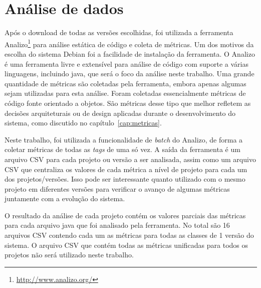 \section{Análise de dados}

Após o download de todas as versões escolhidas, foi utilizada a ferramenta Analizo\footnote{\url{http://www.analizo.org/}}  para análise estática de código e coleta de métricas. Um dos motivos da escolha do sistema Debian foi a facilidade de instalação da ferramenta. O Analizo é uma ferramenta livre e extensível para análise de código com suporte a várias linguagens, incluindo java, que será o foco da análise neste trabalho. Uma grande quantidade de métricas são coletadas pela ferramenta, embora apenas algumas sejam utilizadas para esta análise. Foram coletadas essencialmente métricas de código fonte orientado a objetos. São métricas desse tipo que melhor refletem as decisões arquiteturais ou de design aplicadas durante o desenvolvimento do sistema, como discutido no capítulo~\ref{cap:metricas}.

Neste trabalho, foi utilizada a funcionalidade de \textit{batch} do Analizo, de forma a coletar métricas de todas as \textit{tags} de uma só vez. A saída da ferramenta é um arquivo CSV para cada projeto ou versão a ser analisada, assim como um arquivo CSV que centraliza os valores de cada métrica a nível de projeto para cada um dos projetos/versões. Isso pode ser interessante quanto utilizado com o mesmo projeto em diferentes versões para verificar o avanço de algumas métricas juntamente com a evolução do sistema.

O resultado da análise de cada projeto contém os valores parciais das métricas para cada arquivo java que foi analisado pela ferramenta. No total são 16 arquivos CSV contendo cada um as métricas para todas as classes de 1 versão do sistema. O arquivo CSV que contém todas as métricas unificadas para todos os projetos não será utilizado neste trabalho. 



